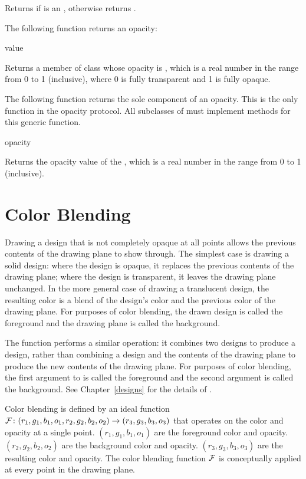 Returns  if  is an , otherwise returns
.


The following function returns an opacity:

 {value}

Returns a member of class  whose opacity is , which is a
real number in the range from 0 to 1 (inclusive), where 0 is fully transparent
and 1 is fully opaque.


The following function returns the sole component of an opacity.  This is the
only function in the opacity protocol.  All subclasses of  must
implement methods for this generic function.

 {opacity}

Returns the opacity value of the  , which is a real
number in the range from 0 to 1 (inclusive).


\section {Color Blending}

Drawing a design that is not completely opaque at all points allows the previous
contents of the drawing plane to show through.  The simplest case is drawing a
solid design:  where the design is opaque, it replaces the previous contents of
the drawing plane; where the design is transparent, it leaves the drawing plane
unchanged.  In the more general case of drawing a translucent design, the
resulting color is a blend of the design's color and the previous color of the
drawing plane.  For purposes of color blending, the drawn design is called the
foreground and the drawing plane is called the background.

The function  performs a similar operation: it combines two
designs to produce a design, rather than combining a design and the contents of
the drawing plane to produce the new contents of the drawing plane.  For
purposes of color blending, the first argument to  is called
the foreground and the second argument is called the background.  See
Chapter~\ref{designs} for the details of .

Color blending is defined by an ideal function
${\cal F}\colon (r_1,g_1,b_1,o_1,r_2,g_2,b_2,o_2)\rightarrow (r_3,g_3,b_3,o_3)$
that operates on the color and opacity at a single point.
$(r_1,g_1,b_1,o_1)$ are the foreground color and opacity.
$(r_2,g_2,b_2,o_2)$ are the background color and opacity.
$(r_3,g_3,b_3,o_3)$ are the resulting color and opacity.  The color
blending function ${\cal F}$ is conceptually applied at every point in the
drawing plane.

